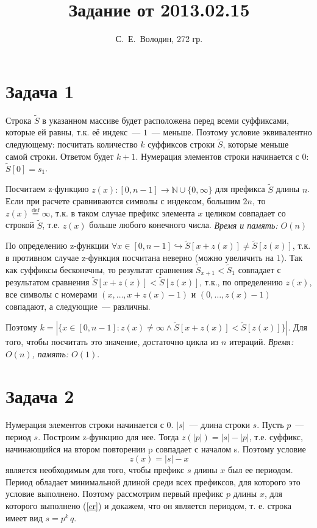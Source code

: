 \documentclass{article}
\title{Задание от 2013.02.15}
\author{С.~Е.~Володин, 272 гр.}
\date{}
\begin{document}
\maketitle
\section{Задача 1}
Строка $\tilde{S}$ в указанном массиве будет расположена перед всеми суффиксами, которые ей равны, т.к. её индекс~--- $1$~--- меньше. Поэтому условие эквивалентно следующему: посчитать количество $k$ суффиксов строки $\tilde{S}$, которые меньше самой строки. Ответом будет $k+1$. Нумерация элементов строки начинается с $0$: $\tilde{S}[0]=s_1$.

Посчитаем z-функцию \begin{math}z(x):[0,n-1]\rightarrow\mathbb{N}\cup\{0,\infty\}\end{math} для префикса $\tilde{S}$ длины $n$. Если при расчете сравниваются символы с индексом, большим $2n$, то $z(x)\stackrel{\mathrm{def}}{=}\infty$, т.к. в таком случае префикс элемента $x$ целиком совпадает со строкой $\tilde{S}$, т.е.  $z(x)$ больше любого конечного числа. {\em Время и память: $O(n)$}

По определению z-функции $\forall x\in[0,n-1]\hookrightarrow\tilde{S}[x+z(x)]\neq\tilde{S}[z(x)]$, т.к. в противном случае z-функция посчитана неверно (можно увеличить на $1$). Так как суффиксы бесконечны, то результат сравнения $\tilde{S}_{x+1}<\tilde{S}_1$ совпадает с результатом сравнения $\tilde{S}[x+z(x)]<\tilde{S}[z(x)]$, т.к., по определению $z(x)$, все символы с номерами $(x,\dots,x+z(x)-1)$ и $(0,\dots,z(x)-1)$ совпадают, а следующие~--- различны.

Поэтому $k=|\{x\in[0,n-1]:z(x)\neq\infty\wedge\tilde{S}[x+z(x)]<\tilde{S}[z(x)]\}|$. Для того, чтобы посчитать это значение, достаточно цикла из $n$ итераций. {\em Время: $O(n)$, память: $O(1)$}.
\section{Задача 2}
Нумерация элементов строки начинается с $0$. $|s|$~--- длина строки $s$. Пусть $p$~--- период $s$. Построим z-функцию для нее. Тогда $z(|p|)=|s|-|p|$, т.е. суффикс, начинающийся на втором повторении p совпадает с началом s.
Поэтому условие \begin{equation}\label{cr}z(x)=|s|-x\end{equation} является необходимым для того, чтобы префикс $s$ длины $x$ был ее периодом. Период обладает минимальной длиной среди всех префиксов, для которого это условие выполнено. Поэтому рассмотрим первый префикс $p$ длины $x$, для которого выполнено (\ref{cr}) и докажем, что он является периодом, т. е. строка имеет вид $s=p^k\,q$.
\end{document}

